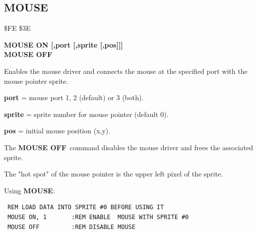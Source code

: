 \subsection{MOUSE}
\begin{description}[leftmargin=2cm,style=nextline]
\item [Token:] \$FE \$3E
\item [Format:] {\bf MOUSE ON [,port [,sprite [,pos]]]} \\
                {\bf MOUSE OFF}
\item [Usage:]  Enables the mouse driver
                and connects the mouse at the specified port
                with the mouse pointer sprite.

                {\bf port} = mouse port 1, 2 (default) or 3 (both).

                {\bf sprite} = sprite number for mouse pointer (default 0).

                {\bf pos} = initial mouse position (x,y).

                The {\bf MOUSE OFF} command disables the mouse
                driver and frees the associated sprite.

\item [Remarks:] The "hot spot" of the mouse pointer is the upper left
                pixel of the sprite.

\item [Example:] Using {\bf MOUSE}:
\begin{tcolorbox}[colback=black,coltext=white]
\verbatimfont{\codefont}
\begin{verbatim}
 REM LOAD DATA INTO SPRITE #0 BEFORE USING IT
 MOUSE ON, 1       :REM ENABLE  MOUSE WITH SPRITE #0
 MOUSE OFF         :REM DISABLE MOUSE
\end{verbatim}
\end{tcolorbox}
\end{description}


\newpage
